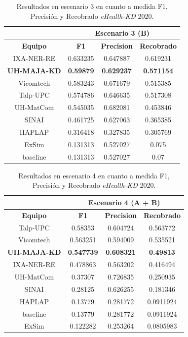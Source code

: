 \begin{table}[tb!]\centering
	\caption{Resultados en escenario 3 en cuanto a medida F1, Precisi\'on y Recobrado \textit{eHealth-KD} 2020. \label{table:results_20_escenario3}}
	\begin{tabular}{|c|c|c|c|}
		\hline
		&  \multicolumn{3}{c|}{\textbf{Escenario 3 (B)}} \\
		\hline
		\textbf{Equipo} & \textbf{F1} & \textbf{Precision} & \textbf{Recobrado} \\
		\hline
		IXA-NER-RE & 0.633235 & 0.647887 & 0.619231 \\
		\textbf{UH-MAJA-KD} & \textbf{0.59879} & \textbf{0.629237} & \textbf{0.571154} \\
		Vicomtech & 0.583243 & 0.671679 & 0.515385 \\
		Talp-UPC & 0.574786 & 0.646635 & 0.517308 \\
		UH-MatCom & 0.545035 & 0.682081 & 0.453846 \\
		SINAI & 0.461725 & 0.627063 & 0.365385 \\
		HAPLAP & 0.316418 & 0.327835 & 0.305769 \\
		ExSim & 0.131313 & 0.527027 & 0.075 \\
		baseline & 0.131313 & 0.527027 & 0.07 \\	
		\hline
	\end{tabular}
\end{table}

\begin{table}[tb!]\centering
	\caption{Resultados en escenario 4 en cuanto a medida F1, Precisi\'on y Recobrado \textit{eHealth-KD} 2020. \label{table:results_20_escenario4}}
	\begin{tabular}{|c|c|c|c|}
		\hline
		&  \multicolumn{3}{c|}{\textbf{Escenario 4 (A + B)}} \\
		\hline
		\textbf{Equipo} & \textbf{F1} & \textbf{Precision} & \textbf{Recobrado} \\
		\hline
		Talp-UPC & 0.58353 & 0.604724 & 0.563772 \\
		Vicomtech & 0.563251 & 0.594009 & 0.535521 \\
		\textbf{UH-MAJA-KD} & \textbf{0.547739} & \textbf{0.608321} & \textbf{0.49813} \\
		IXA-NER-RE & 0.478863 & 0.563202 & 0.416494 \\
		UH-MatCom & 0.37307 & 0.726835 & 0.250935 \\
		SINAI & 0.28125 & 0.626255 & 0.181346 \\
		HAPLAP & 0.13779 & 0.281772 & 0.0911924 \\
		baseline & 0.13779 & 0.281772 & 0.0911924 \\
		ExSim & 0.122282 & 0.253264 & 0.0805983 \\	
		\hline
	\end{tabular}
\end{table}

